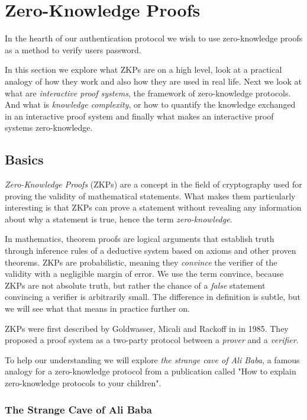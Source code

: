 \section{Zero-Knowledge Proofs}
In the hearth of our authentication protocol we wish to use zero-knowledge proofs as a method to verify users password.

In this section we explore what ZKPs are on a high level, look at a practical analogy of how they work and also how they are used in real life.
Next we look at what are \textit{interactive proof systems}, the framework of zero-knowledge protocols.
And what is \textit{knowledge complexity}, or how to quantify the knowledge exchanged in an interactive proof system and finally what makes an interactive proof systems zero-knowledge.

\subsection{Basics}
\textit{Zero-Knowledge Proofs} (ZKPs) are a concept in the field of cryptography used for proving the validity of mathematical statements.
What makes them particularly interesting is that ZKPs can prove a statement without revealing any information about why a statement is true, hence the term \textit{zero-knowledge}.

In mathematics, theorem proofs are logical arguments that establish truth through inference rules of a deductive system based on axioms and other proven theorems.
ZKPs are probabilistic, meaning they \textit{convince} the verifier of the validity with a negligible margin of error.
We use the term convince, because ZKPs are not absolute truth, but rather the chance of a \textit{false} statement convincing a verifier is arbitrarily small. 
The difference in definition is subtle, but we will see what that means in practice further on.

ZKPs were first described by Goldwasser, Micali and Rackoff in \cite{goldwasser1989knowledge} in 1985. 
They proposed a proof system as a two-party protocol between a \textit{prover} and a \textit{verifier}.

To help our understanding we will explore \cite{QJM} \textit{the strange cave of Ali Baba}, a famous analogy for a zero-knowledge protocol from a publication called "How to explain zero-knowledge protocols to your children".

\newpage
\subsubsection{The Strange Cave of Ali Baba}


